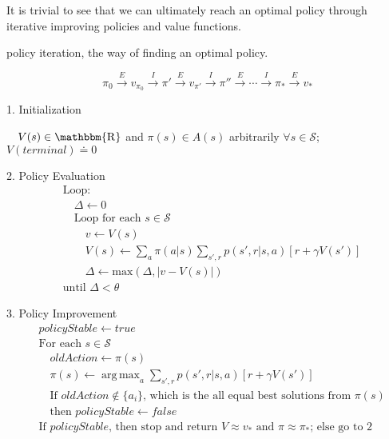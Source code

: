 \documentclass[lang=en,mode=geye,device=normal,color=blue,14pt]{elegantnote}
\DeclareMathOperator*{\1}{\mathbbm{1}}
\DeclareMathOperator*{\R}{\mathbbm{R}}
\DeclareMathOperator*{\argmax}{arg\,max}
\begin{document}
It is trivial to see that we can ultimately reach an optimal policy through iterative improving policies and value functions.

\begin{definition}
policy iteration, the way of finding an optimal policy.

$$\pi_0 \xrightarrow{E} v_{\pi_0} \xrightarrow{I} \pi' \xrightarrow{E} v_{\pi'} \xrightarrow{I} \pi'' \xrightarrow{E} \cdots \xrightarrow{I} \pi_* \xrightarrow{E} v_* $$
\end{definition}

\begin{tcolorbox}[width=\textwidth,title={Policy Iteration (using iterative policy evaluation) for estimating $\pi \approx \pi_*$}]
1. Initialization

$\quad V(s) \in\R$ and $\pi(s) \in A(s)$ arbitrarily $\forall s \in \mathcal{S}$; $V(terminal) \doteq 0$

2. Policy Evaluation
\begin{align*}
&\text{Loop:}\\
&\quad\Delta \leftarrow 0\\
&\quad\text{Loop for each } s \in \mathcal{S}\\
&\quad\quad v \leftarrow V(s)\\
&\quad\quad V(s) \leftarrow \sum_a \pi (a|s) \sum_{s',r} p(s',r|s,a)[r + \gamma V(s')]\\
&\quad\quad \Delta \leftarrow \text{max}(\Delta, |v-V(s)|)\\
&\text{until } \Delta < \theta
\end{align*}

3. Policy Improvement
\begin{align*}
&policyStable \leftarrow true\\
&\text{For each } s \in \mathcal{S}\\
&\quad oldAction \leftarrow \pi(s)\\
&\quad \pi(s) \leftarrow \argmax_a \sum_{s',r} p(s',r|s,a)[r+\gamma V(s')]\\
&\quad \text{If } oldAction \notin \{a_i\} \text{, which is the all equal best solutions from $\pi(s)$}\\
& \quad \text{then } policyStable \leftarrow false\\
&\text{If } policyStable \text{, then stop and return } V \approx v_* \text{ and } \pi \approx \pi_*\text{; else go to 2}	
\end{align*}
\end{tcolorbox}
\end{document}
